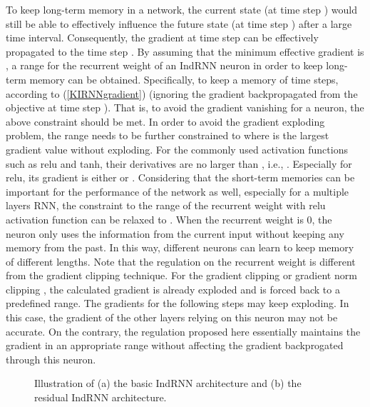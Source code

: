 \documentclass[10pt,twocolumn,letterpaper]{article}
\begin{document}
To keep long-term memory in a network, the current state (at time step ) would still be able to effectively influence the future state (at time step ) after a large time interval. Consequently, the gradient at time step  can be effectively propagated to the time step . By assuming that the minimum effective gradient is , a range for the recurrent weight of an IndRNN neuron in order to keep long-term memory can be obtained. Specifically, to keep a memory of  time steps,  according to (\ref{KIRNNgradient}) (ignoring the gradient backpropagated from the objective at time step ). That is, to avoid the gradient vanishing for a neuron, the above constraint should be met. In order to avoid the gradient exploding problem, the range needs to be further constrained to  where  is the largest gradient value without exploding. For the commonly used activation functions such as relu and tanh, their derivatives are no larger than , i.e., . Especially for relu, its gradient is either  or . Considering that the short-term memories can be important for the performance of the network as well, especially for a multiple layers RNN, the constraint to the range of the recurrent weight with relu activation function can be relaxed to . When the recurrent weight is 0, the neuron only uses the information from the current input without keeping any memory from the past. In this way, different neurons can learn to keep memory of different lengths. Note that the regulation on the recurrent weight  is different from the gradient clipping technique. For the gradient clipping or gradient norm clipping \cite{pascanu2013difficulty}, the calculated gradient is already exploded and is forced back to a predefined range. The gradients for the following steps may keep exploding. In this case, the gradient of the other layers relying on this neuron may not be accurate. On the contrary, the regulation proposed here essentially maintains the gradient in an appropriate range without affecting the gradient backprogated through this neuron.  
\vspace{0.1cm}

\begin{figure}[tbp]
	\centering
	\caption{Illustration of (a) the basic IndRNN architecture and (b) the residual IndRNN architecture.} 
\label{rnnillustration}
\end{figure}
\end{document}
